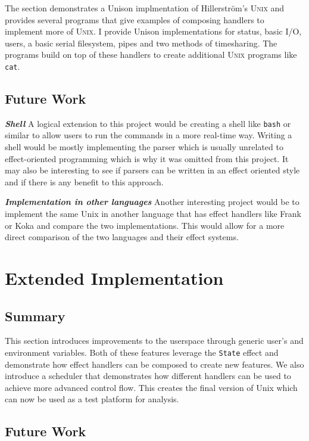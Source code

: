 \documentclass[logo,bsc,singlespacing,parskip]{infthesis}
\begin{document}
The section demonstrates a Unison implmentation of Hillerstr\"{o}m's
\textsc{Unix} and provides several programs that give examples of composing
handlers to implement more of \textsc{Unix}. I provide Unison implementations
for status, basic I/O, users, a basic serial filesystem, pipes and two methods
of timesharing. The programs build on top of these handlers to create
additional \textsc{Unix} programs like \texttt{cat}.

\subsection{Future Work}

\emph{\textbf{Shell}} A logical extension to this project would be creating a shell like \texttt{bash}
or similar to allow users to run the commands in a more real-time way. Writing a
shell would be mostly implementing the parser which is usually unrelated to
effect-oriented programming which is why it was omitted from this project.  It
may also be interesting to see if parsers can be written in an effect oriented
style and if there is any benefit to this approach.

\emph{\textbf{Implementation in other languages}} Another interesting project
would be to implement the same Unix in another language that has effect handlers like
Frank or Koka and compare the two implementations. This would allow for a more
direct comparison of the two languages and their effect systems.

\section{Extended Implementation}

\subsection{Summary}

This section introduces improvements to the userspace through generic
user's and environment variables. Both of these features leverage the
\texttt{State} effect and demonstrate how effect handlers can be composed to
create new features. We also introduce a scheduler that demonstrates how
different handlers can be used to achieve more advanced control flow. This
creates the final version of Unix which can now be used as a test platform for
analysis.

\subsection{Future Work}
\end{document}
